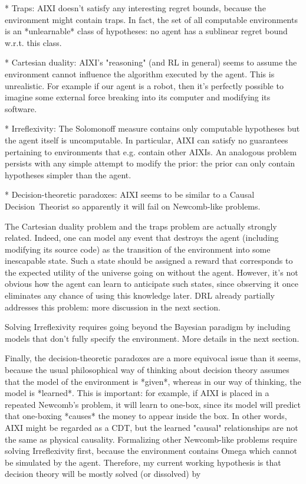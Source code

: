 \documentclass[a4paper]{article}
\begin{document}
* Traps: AIXI doesn't satisfy any interesting regret bounds, because the environment might contain traps. In fact, the set of all computable environments is an *unlearnable* class of hypotheses: no agent has a sublinear regret bound w.r.t. this class.

* Cartesian duality: AIXI's "reasoning" (and RL in general) seems to assume the environment cannot influence the algorithm executed by the agent. This is unrealistic. For example if our agent is a robot, then it's perfectly possible to imagine some external force breaking into its computer and modifying its software.

* Irreflexivity: The Solomonoff measure contains only computable hypotheses but the agent itself is uncomputable. In particular, AIXI can satisfy no guarantees pertaining to environments that e.g. contain other AIXIs. An analogous problem persists with any simple attempt to modify the prior: the prior can only contain hypotheses simpler than the agent.

* Decision-theoretic paradoxes: AIXI seems to be similar to a Causal Decision\ Theorist so apparently it will fail on Newcomb-like problems.

The Cartesian duality problem and the traps problem are actually strongly related. Indeed, one can model any event that destroys the agent (including modifying its source code) as the transition of the environment into some inescapable state. Such a state should be assigned a reward that corresponds to the expected utility of the universe going on without the agent. However, it's not obvious how the agent can learn to anticipate such states, since observing it once eliminates any chance of using this knowledge later. DRL already partially addresses this problem: more discussion in the next section.

Solving Irreflexivity requires going beyond the Bayesian paradigm by including models that don't fully specify the environment. More details in the next section.

Finally, the decision-theoretic paradoxes are a more equivocal issue than it seems, because the usual philosophical way of thinking about decision theory assumes that the model of the environment is *given*, whereas in our way of thinking, the model is *learned*. This is important: for example, if AIXI is placed in a repeated Newcomb's problem, it will learn to one-box, since its model will predict that one-boxing *causes* the money to appear inside the box. In other words, AIXI might be regarded as a CDT, but the learned "causal" relationships are not the same as physical causality. Formalizing other Newcomb-like problems require solving Irreflexivity first, because the environment contains Omega which cannot be simulated by the agent. Therefore, my current working hypothesis is that decision theory will be mostly solved (or dissolved) by
\end{document}
